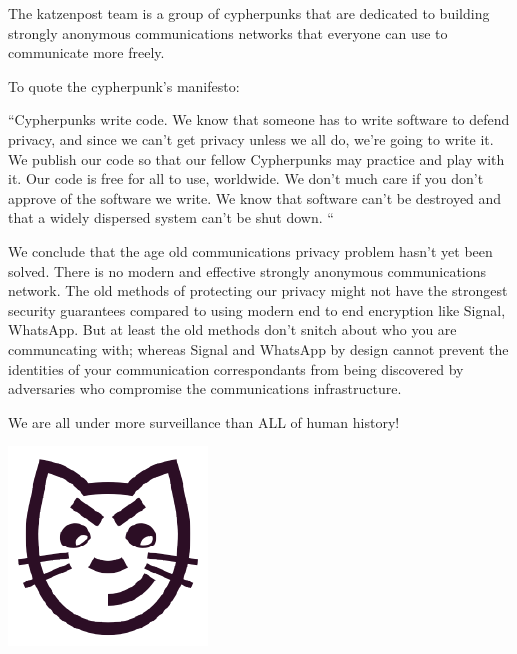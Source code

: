 \documentclass[statementpaper,oneside,article,14pt]{memoir}
\begin{document}
\newpage

The katzenpost team is a group of cypherpunks that are dedicated to
building strongly anonymous communications networks that everyone can
use to communicate more freely.

To quote the cypherpunk's manifesto:

``Cypherpunks write code. We know that someone has to write software
to defend privacy, and since we can't get privacy unless we all do,
we're going to write it. We publish our code so that our fellow
Cypherpunks may practice and play with it. Our code is free for all to
use, worldwide. We don't much care if you don't approve of the
software we write. We know that software can't be destroyed and that a
widely dispersed system can't be shut down. ``

\newpage

We conclude that the age old communications privacy problem hasn't yet
been solved. There is no modern and effective strongly anonymous
communications network. The old methods of protecting our privacy
might not have the strongest security guarantees compared to using
modern end to end encryption like Signal, WhatsApp. But at least the
old methods don't snitch about who you are communcating with; whereas
Signal and WhatsApp by design cannot prevent the identities of your
communication correspondants from being discovered by adversaries who
compromise the communications infrastructure.



\newpage

\Large We are all under more surveillance than ALL of human history!

\begin{center}
  \includegraphics[scale=.2]{katzenpost_logo} \\
\end{center}
\end{document}
